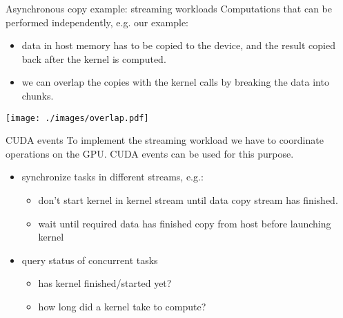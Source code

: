 \begin{frame}[fragile]{}
    \begin{info}{Asynchronous copy example: streaming workloads}
        Computations that can be performed independently, e.g. our \axpy example:
        \begin{itemize}
            \item data in host memory has to be copied to the device, and the result copied back after the kernel is computed.
            \item we can overlap the copies with the kernel calls by breaking the data into chunks.
        \end{itemize}
    \end{info}
    \texttt{[image: ./images/overlap.pdf]}
\end{frame}

\begin{frame}[fragile]{}
    \begin{info}{CUDA events}
        To implement the streaming workload we have to coordinate operations on the GPU.
        CUDA events can be used for this purpose.
        \begin{itemize}
            \item synchronize tasks in different streams, e.g.:
            \begin{itemize}
                \item don't start kernel in kernel stream until data copy stream has finished.
                \item wait until required data has finished copy from host before launching kernel
            \end{itemize}
            \item query status of concurrent tasks
            \begin{itemize}
                \item has kernel finished/started yet?
                \item how long did a kernel take to compute?
            \end{itemize}
        \end{itemize}
    \end{info}
\end{frame}


